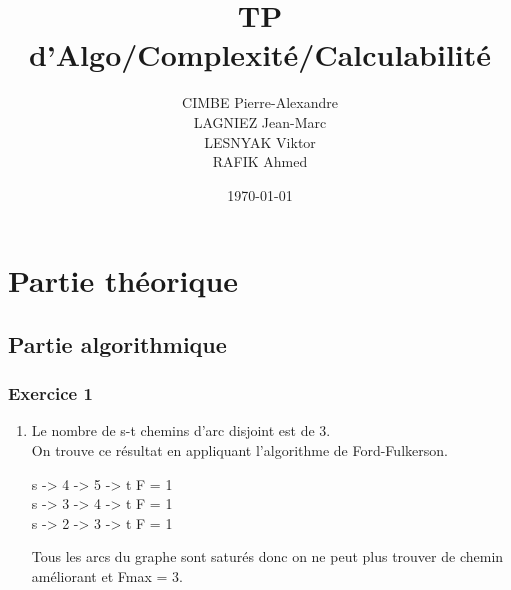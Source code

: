 \documentclass[]{article}
\title{TP d'Algo/Complexité/Calculabilité}
\author{
  CIMBE Pierre-Alexandre \\
  LAGNIEZ Jean-Marc \\
  LESNYAK Viktor \\
  RAFIK Ahmed}
\date\today
\begin{document}
\maketitle

\section{Partie théorique}
\subsection{Partie algorithmique}

\subsubsection{Exercice 1}

\begin{enumerate}

\item Le nombre de s-t chemins d'arc disjoint est de 3.\\
On trouve ce résultat en appliquant l'algorithme de Ford-Fulkerson.\\
\begin{center}
s -> 4 -> 5 -> t      F = 1\\
s -> 3 -> 4 -> t      F = 1\\
s -> 2 -> 3 -> t      F = 1\\
\end{center}
Tous les arcs du graphe sont saturés donc on ne peut plus trouver de chemin améliorant et Fmax = 3.\\



\end{enumerate}
\end{document}
